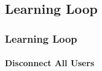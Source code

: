 %
%
%
%
%
\subsection{Learning Loop}
\subsubsection{Learning Loop}
\paragraph[Disconnect Users]{Disconnect All Users\texorpdfstring{\\}{}}

